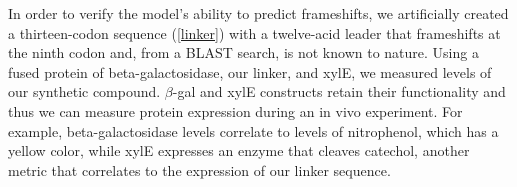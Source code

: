 \documentclass[12pt, draft]{article}
\numberwithin{equation}{section}
\begin{document}
In order to verify the model's ability to predict frameshifts, we
artificially created a thirteen-codon sequence (\autoref{linker})
with a twelve-acid leader that frameshifts at the ninth codon and,
from a BLAST search, is not known to nature.  Using a fused protein of
beta-galactosidase, our linker, and xylE, we measured levels of our
synthetic compound. $\beta$-gal and xylE constructs retain their
functionality and thus we can measure protein expression during an in
vivo experiment. For example, beta-galactosidase levels correlate to
levels of nitrophenol, which has a yellow color, while xylE expresses
an enzyme that cleaves catechol, another metric that correlates to the
expression of our linker sequence.


\begin{singlespace}
  
\end{singlespace}
\end{document}
